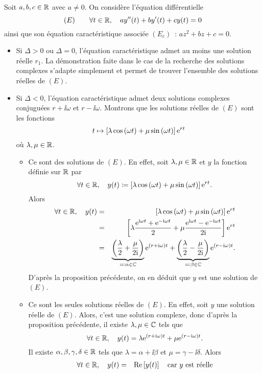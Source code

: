 \documentclass{magnolia}
\begin{document}
\begin{preuve}
\begin{francois}
Soit $a,b,c\in\mathbb{R}$ avec $a\neq 0$. On considère l'équation différentielle
\[(E)\qquad\forall t\in\mathbb{R} ,\quad a y''(t)+by'(t)+cy(t)=0\]
ainsi que son équation caractéristique associée $(E_c)$~: $az^2+bz+c=0$.
\begin{itemize}
\item Si $\Delta>0$ ou $\Delta=0$, l'équation caractéristique admet au moins une solution réelle $r_1$. La démonstration faite dans le cas de la recherche des solutions complexes s'adapte simplement et permet de trouver l'ensemble des solutions réelles de $(E)$.
\item Si $\Delta<0$, l'équation caractéristique admet deux solutions complexes conjuguées $r+\ii\omega$ et $r-\ii\omega$. Montrons que les solutions réelles de $(E)$ sont les fonctions
\[t\mapsto \left[\lambda\cos\left(\omega t\right)+\mu\sin\left(\omega t\right)\right]{\rm e}^{r t}\]
où $\lambda,\mu\in\mathbb{R}$.
\begin{itemize}
\item Ce sont des solutions de $(E)$. En effet, soit $\lambda,\mu\in\mathbb{R}$ et $y$ la fonction définie sur $\mathbb{R}$ par
\[\forall t\in\mathbb{R},\quad y(t)\coloneqq \left[\lambda\cos\left(\omega t\right)+\mu\sin\left(\omega t\right)\right]{\rm e}^{r t}.\]
Alors
\begin{eqnarray*}
\forall t\in\mathbb{R},\quad y(t)
&=& \left[\lambda\cos\left(\omega t\right)+\mu\sin\left(\omega t\right)\right]{\rm e}^{r t}\\
&=& \left[\lambda\frac{{\rm e}^{{\rm i}\omega t}+{\rm e}^{-{\rm i}\omega t}}{2}+\mu\frac{{\rm e}^{{\rm i}\omega t}-{\rm e}^{-{\rm i}\omega t}}{2{\rm i}}\right]{\rm e}^{r t}\\
&=& \underbrace{\left(\frac{\lambda}{2}+\frac{\mu}{2{\rm i}}\right)}_{\eqqcolon \alpha\in\mathbb{C}}{\rm e}^{(r+{\rm i}\omega)t}+\underbrace{\left(\frac{\lambda}{2}-\frac{\mu}{2{\rm i}}\right)}_{\eqqcolon \beta\in\mathbb{C}}{\rm e}^{(r-{\rm i}\omega)t}.
\end{eqnarray*}
D'après la proposition précédente, on en déduit que $y$ est une solution de $(E)$.
\item Ce sont les seules solutions réelles de $(E)$. En effet, soit $y$ une solution réelle de $(E)$. Alors, c'est une solution complexe, donc d'après la proposition précédente, il existe $\lambda,\mu\in\mathbb{C}$ tels que
\[\forall t\in\mathbb{R},\quad y(t)=\lambda{\rm e}^{(r+{\rm i}\omega)t}+\mu{\rm e}^{(r-{\rm i}\omega)t}.\]
Il existe $\alpha,\beta,\gamma,\delta\in\mathbb{R}$ tels que $\lambda=\alpha+\ii\beta$ et $\mu=\gamma-\ii\delta$. Alors
\begin{eqnarray*}
\forall t\in\R\qsep y(t)
&=& \Re\cro{y(t)}\quad\text{car $y$ est réelle}\\

\end{eqnarray*}
\end{itemize}
\end{itemize}
\end{francois}
\end{preuve}
\end{document}
